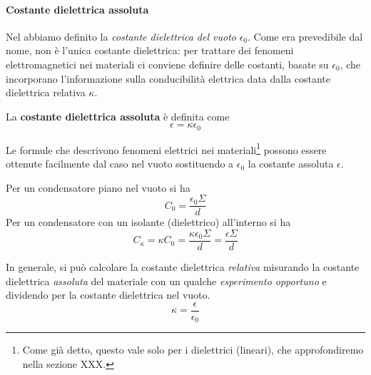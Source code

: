 \paragraph{Costante dielettrica assoluta}
Nel  abbiamo definito la \textit{costante dielettrica del vuoto} $\epsilon_0$. Come era prevedibile dal nome, non è l'unica costante dielettrica: per trattare dei fenomeni elettromagnetici nei materiali ci conviene definire delle costanti, basate su $\epsilon_0$, che incorporano l'informazione sulla conducibilità elettrica data dalla costante dielettrica relativa $\kappa$.
\begin{define}
	La \textbf{costante dielettrica assoluta} è definita come
	\begin{equation}
		\epsilon=\kappa\epsilon_0
	\end{equation}
\end{define}
Le formule che descrivono fenomeni elettrici nei materiali\footnote{Come già detto, questo vale solo per i dielettrici (lineari), che approfondiremo nella sezione XXX.} possono essere ottenute facilmente dal caso nel vuoto sostituendo a $\epsilon_0$ la costante assoluta $\epsilon$.
\begin{example}
	Per un condensatore piano nel vuoto si ha
	\begin{equation*}
		C_0=\frac{\epsilon_0\Sigma}{d}
	\end{equation*}
	Per un condensatore con un isolante (dielettrico) all'interno si ha
	\begin{equation*}
		C_{\kappa}=\kappa C_0=\frac{\kappa\epsilon_0\Sigma}{d}=\frac{\epsilon\Sigma}{d}
	\end{equation*}
\end{example}
\begin{observe}
	In generale, si può calcolare la costante dielettrica \textit{relativa} misurando la costante dielettrica \textit{assoluta} del materiale con un qualche \textit{esperimento opportuno} e dividendo per la costante dielettrica nel vuoto.
	\begin{equation}
		\kappa=\frac{\epsilon}{\epsilon_0}
	\end{equation}
\end{observe}
